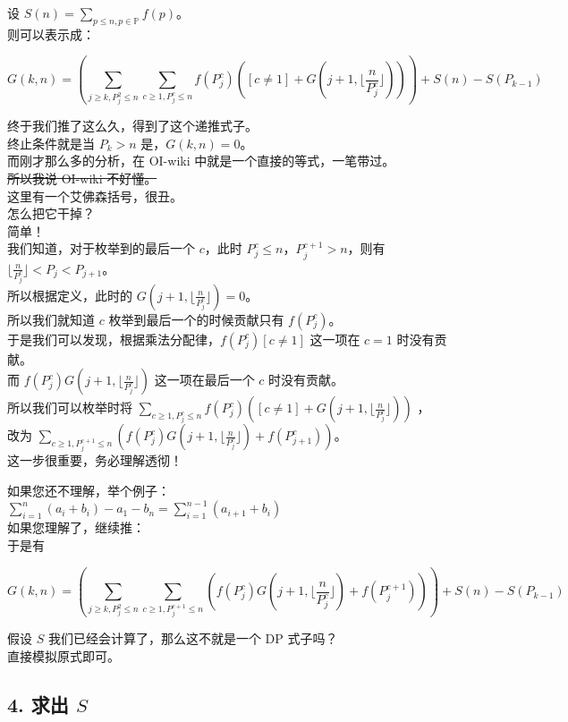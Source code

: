 \documentclass[
]{article}
\begin{document}
设 \(S(n)=\displaystyle\sum_{p\le n,p\in\mathbb{P}}f(p)\)。\\
则可以表示成：

\[G(k,n)=\left(\sum_{j\ge k,P_j^2\le n}\sum_{c \ge1,P_j^c\le n}f(P_j^c)([c\ne 1]+G(j+1,\lfloor\frac{n}{P_j^c}\rfloor))\right)+S(n)-S(P_{k-1})\]

终于我们推了这么久，得到了这个递推式子。\\
终止条件就是当 \(P_k>n\) 是，\(G(k,n)=0\)。\\
而刚才那么多的分析，在 OI-wiki 中就是一个直接的等式，一笔带过。\\
\st{所以我说 OI-wiki 不好懂。} \\
这里有一个艾佛森括号，很丑。\\
怎么把它干掉？\\
简单！\\
我们知道，对于枚举到的最后一个 \(c\)，此时
\(P_j^c\le n\)，\(P_j^{c+1}>n\)，则有
\(\lfloor\frac{n}{P_j^c}\rfloor<P_j<P_{j+1}\)。\\
所以根据定义，此时的 \(G(j+1,\lfloor\frac{n}{P_j^c}\rfloor)=0\)。\\
所以我们就知道 \(c\) 枚举到最后一个的时候贡献只有 \(f(P_j^c)\)。\\
于是我们可以发现，根据乘法分配律，\(f (P_j^c)[c\ne 1]\) 这一项在 \(c=1\)
时没有贡献。\\
而 \(f(P_j^c)G(j+1,\lfloor\frac{n}{P_j^c}\rfloor)\) 这一项在最后一个
\(c\) 时没有贡献。 \\
所以我们可以枚举时将
\(\displaystyle\sum_{c \ge1,P_j^c\le n}f(P_j^c)([c\ne 1]+G(j+1,\lfloor\frac{n}{P_j^c}\rfloor))\)
，\\
改为
\(\displaystyle\sum_{c \ge1,P_{j}^{c+1}\le n}\left(f(P_j^c)G(j+1,\lfloor\frac{n}{P_j^c}\rfloor)+f(P_{j+1}^{c})\right)\)。\\
这一步很重要，务必理解透彻！

如果您还不理解，举个例子：\\
\(\sum_{i=1}^n(a_i+b_i)-a_1-b_n=\sum_{i=1}^{n-1}(a_{i+1}+b_i)\)\\
如果您理解了，继续推：\\
于是有

\[G(k,n)=\left(\sum_{j\ge k,P_j^2\le n}\sum_{c \ge1,P_{j}^{c+1}\le n}\left(f(P_j^c)G(j+1,\lfloor\frac{n}{P_j^c}\rfloor)+f(P_{j}^{c+1})\right)\right)+S(n)-S(P_{k-1})\]

假设 \(S\) 我们已经会计算了，那么这不就是一个 DP 式子吗？\\
直接模拟原式即可。

\subsection{\texorpdfstring{4. 求出
\(S\)}{4. 求出 S}}\label{4-ux6c42ux51fa--ux1d446}
\end{document}
